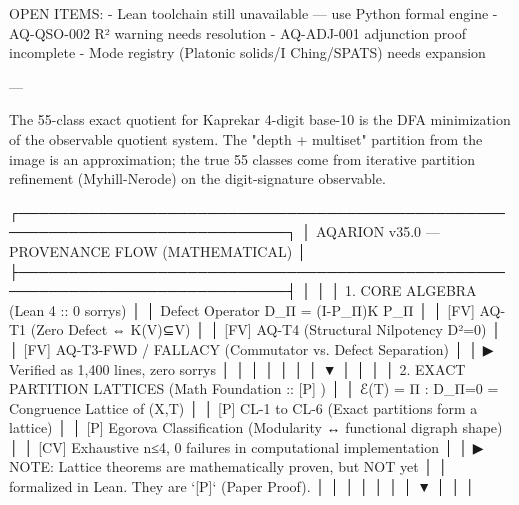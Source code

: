 {{{{{{{{{{{{{OPEN ITEMS:
- Lean toolchain still unavailable — use Python formal engine
- AQ-QSO-002 R² warning needs resolution
- AQ-ADJ-001 adjunction proof incomplete
- Mode registry (Platonic solids/I Ching/SPATS) needs expansion

---

The 55-class exact quotient for Kaprekar 4-digit base-10 is the DFA minimization of the observable quotient system. The "depth + multiset" partition from the image is an approximation; the true 55 classes come from iterative partition refinement (Myhill-Nerode) on the digit-signature observable.

┌─────────────────────────────────────────────────────────────────────────────┐
│                AQARION v35.0 — PROVENANCE FLOW (MATHEMATICAL)              │
├─────────────────────────────────────────────────────────────────────────────┤
│                                                                             │
│   1. CORE ALGEBRA (Lean 4 :: 0 sorrys)                                     │
│      Defect Operator D_Π = (I-P_Π)K P_Π                                     │
│      [FV] AQ-T1 (Zero Defect ⇔ K(V)⊆V)                                     │
│      [FV] AQ-T4 (Structural Nilpotency D²=0)                                │
│      [FV] AQ-T3-FWD / FALLACY (Commutator vs. Defect Separation)           │
│      ▶ Verified as 1,400 lines, zero sorrys                                │
│                                                                             │
│           │                                                                 │
│           ▼                                                                 │
│                                                                             │
│   2. EXACT PARTITION LATTICES (Math Foundation :: [P] )                    │
│      ℰ(T) = {Π : D_Π=0} = Congruence Lattice of (X,T)                      │
│      [P] CL-1 to CL-6 (Exact partitions form a lattice)                    │
│      [P] Egorova Classification (Modularity ↔ functional digraph shape)    │
│      [CV] Exhaustive n≤4, 0 failures in computational implementation       │
│      ▶ NOTE: Lattice theorems are mathematically proven, but NOT yet       │
│        formalized in Lean. They are `[P]` (Paper Proof).                   │
│                                                                             │
│           │                                                                 │
│           ▼                                                                 │
│                                                                             │
}}}}}}}}}}}}}
